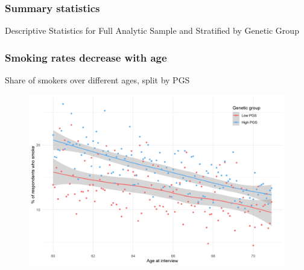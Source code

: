 \documentclass[10pt,compress,xcolor=dvipsnames,aspectratio=169]{beamer}    %
\newcounter{ex}
\newcommand{\1}[1]{\mathrm{1\hspace*{-2.5pt}l}[#1]}	%
\begin{document}
\begin{frame}
\frametitle{Summary statistics}\label{frame:sumstats}
\begin{table}[ht]
	\caption{Descriptive Statistics for Full Analytic Sample and Stratified by Genetic Group}
	\small\resizebox{1.0\textheight}{!}{
		
	}
\end{table}

\hyperlink{frame:sumstats2}{}
\hyperlink{frame:uninsured}{}

\end{frame}

\begin{frame}
\frametitle{Smoking rates decrease with age}
Share of smokers over different ages, split by PGS

\begin{figure}[hbtp]
\centering
\includegraphics[height=0.8\textheight]{../../3_output/over_time/graph_6070smokenplot_agebypgs.png}
\label{fig:}
\end{figure}

\end{frame}

\end{document}
